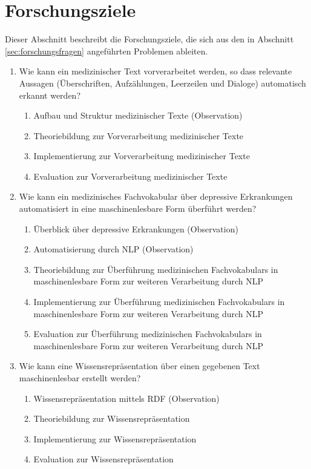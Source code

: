 
\section{Forschungsziele}

Dieser Abschnitt beschreibt die Forschungsziele, die sich aus den in Abschnitt \ref{sec:forschungsfragen} angeführten Problemen ableiten.


\begin{enumerate}[label=FZ \arabic*]
\item Wie kann ein medizinischer Text vorverarbeitet werden, so dass relevante Aussagen (Überschriften, Aufzählungen, Leerzeilen und Dialoge) automatisch erkannt werden?

\begin{enumerate}[label=\theenumi.\arabic*]
\item Aufbau und Struktur medizinischer Texte (Observation)
\item Theoriebildung zur Vorverarbeitung medizinischer Texte
\item Implementierung zur Vorverarbeitung medizinischer Texte 
\item Evaluation zur Vorverarbeitung medizinischer Texte
\end{enumerate}

\item Wie kann ein medizinisches Fachvokabular über depressive Erkrankungen automatisiert in eine maschinenlesbare Form überführt werden?

\begin{enumerate}[label=\theenumi.\arabic*]
\item Überblick über depressive Erkrankungen (Observation)
\item Automatisierung durch NLP (Observation)
\item Theoriebildung zur Überführung medizinischen Fachvokabulars in maschinenlesbare Form zur weiteren Verarbeitung durch NLP 
\item Implementierung zur Überführung medizinischen Fachvokabulars in maschinenlesbare Form zur weiteren Verarbeitung durch NLP
\item Evaluation zur Überführung medizinischen Fachvokabulars in maschinenlesbare Form zur weiteren Verarbeitung durch NLP

\end{enumerate}

\item Wie kann eine Wissensrepräsentation über einen gegebenen Text maschinenlesbar erstellt werden?

\begin{enumerate}[label=\theenumi.\arabic*]
\item Wissensrepräsentation mittels RDF (Observation)
\item Theoriebildung zur Wissensrepräsentation
\item Implementierung zur Wissensrepräsentation 
\item Evaluation zur Wissensrepräsentation
\end{enumerate}

\end{enumerate}

